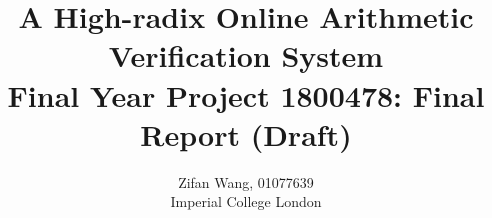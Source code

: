 \documentclass[11pt]{article}
\begin{document}
\title{%
  A High-radix Online Arithmetic Verification System\\
  \large Final Year Project 1800478: Final Report (Draft)}
\author{Zifan Wang, 01077639\\Imperial College London}

\maketitle
\setcounter{tocdepth}{2}
\tableofcontents

\newpage


% 
% 
% 
% 
% 
% 
% 
% 

\newpage
\appendix

% 


\end{document}
